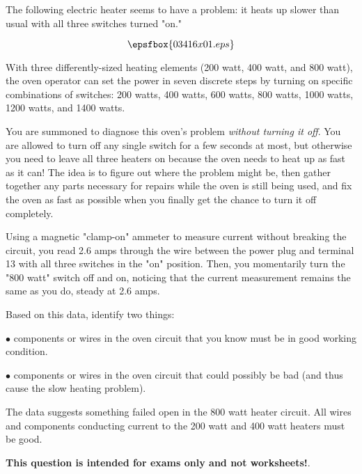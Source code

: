 

The following electric heater seems to have a problem: it heats up slower than usual with all three switches turned "on."

$$\epsfbox{03416x01.eps}$$

With three differently-sized heating elements (200 watt, 400 watt, and 800 watt), the oven operator can set the power in seven discrete steps by turning on specific combinations of switches: 200 watts, 400 watts, 600 watts, 800 watts, 1000 watts, 1200 watts, and 1400 watts.

You are summoned to diagnose this oven's problem {\it without turning it off}.  You are allowed to turn off any single switch for a few seconds at most, but otherwise you need to leave all three heaters on because the oven needs to heat up as fast as it can!  The idea is to figure out where the problem might be, then gather together any parts necessary for repairs while the oven is still being used, and fix the oven as fast as possible when you finally get the chance to turn it off completely.

Using a magnetic "clamp-on" ammeter to measure current without breaking the circuit, you read 2.6 amps through the wire between the power plug and terminal 13 with all three switches in the "on" position.  Then, you momentarily turn the "800 watt" switch off and on, noticing that the current measurement remains the same as you do, steady at 2.6 amps.

Based on this data, identify two things:

\vskip 10pt

\medskip
\item{$\bullet$}  components or wires in the oven circuit that you know must be in good working condition.
\vskip 40pt
\item{$\bullet$}  components or wires in the oven circuit that could possibly be bad (and thus cause the slow heating problem).
\medskip







The data suggests something failed open in the 800 watt heater circuit.  All wires and components conducting current to the 200 watt and 400 watt heaters must be good.







{\bf This question is intended for exams only and not worksheets!}.



